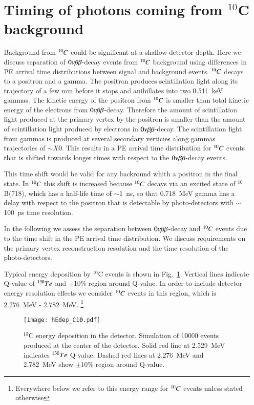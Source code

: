 \section{Timing of photons coming from $^{10}$C background}

Background from $^{10}C$ could be significant at a shallow detector depth.
Here we discuss separation of $0\nu\beta\beta$-decay events from $^{10}C$ background using 
differences in PE arrival time distributions between signal and background events.
$^{10}C$ decays to a positron and a gamma. The positron produces scintillation light 
along its trajectory of a few mm before it stops and anihillates into two 0.511~keV 
gammas. The kinetic energy of the positron from $^{10}C$ is smaller than total kinetic
energy of the electrons from $0\nu\beta\beta$-decay. Therefore the amount of scintillation 
light produced at the primary vertex by the positron is smaller than the amount of 
scintillation light produced by electrons in $0\nu\beta\beta$-decay. The scintillation light from 
gammas is produced at several secondary verticies along gammas trajectories of $\sim X0$. 
This results in a PE arrival time distribution for $^{10}C$ events that is shifted towards 
longer times with respect to the $0\nu\beta\beta$-decay events.

This time shift would be valid for any backround whith a positron in the final state. In 
$^{10}C$ this shift is increased because $^{10}C$ decays via an excited state of $^{10}$B(718),
which has a half-life time of $\sim$1~ns, so that 0.718~MeV gamma has a delay with respect
to the positron that is detectable by photo-detectors with $\sim$100~ps time resolution.

In the following we assess the separation between $0\nu\beta\beta$-decay and $^{10}C$ events due to the 
time shift in the PE arrival time distribution. We discuss requirements on the primary vertex 
reconstruction resolution and the time resolution of the photo-detectors.

Typical energy deposition by $^{10}$C events is shown in
Fig.~\ref{fig:Edep_C10}. Vertical lines indicate Q-value of $^{130}Te$ and 
$\pm$10\% region around Q-value. In order to include detector energy resolution 
effects we consider $^{10}C$ events in this region, which is 2.276~MeV - 2.782~MeV.
\footnote{Everywhere below we refer to this energy range for $^{10}C$ events unless 
stated otherwise}


\begin{figure}[h]
  \centering
  \texttt{[image: hEdep\_C10.pdf]}
  \caption{$^{10}$C energy deposition in the detector. Simulation of 10000 events
  produced at the center of the detector. Solid red line at 2.529~MeV indicates $^{130}Te$ 
  Q-value. Dashed red lines at 2.276~MeV and 2.782~MeV show $\pm$10\% region around 
  Q-value.}
  \label{fig:Edep_C10}
\end{figure}

